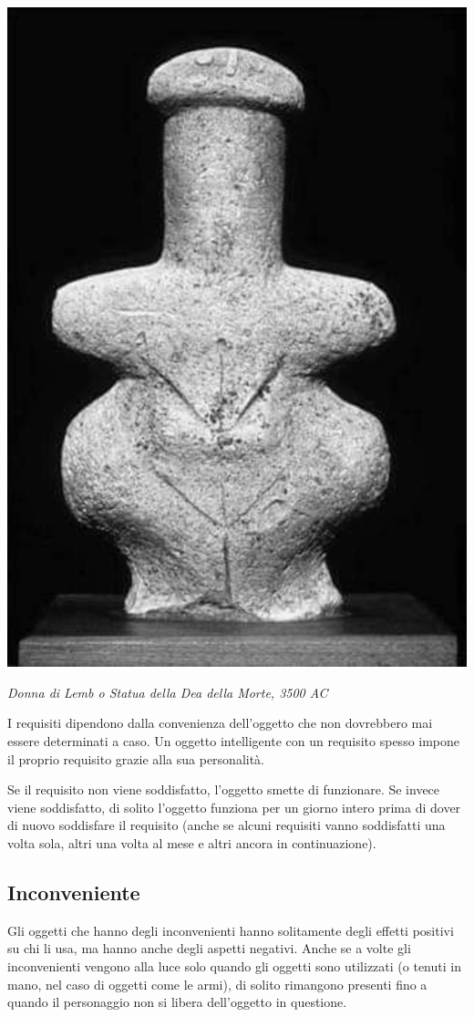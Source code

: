 \begin{multicols}{2}
	\begin{center}
		\includegraphics[width=0.8\linewidth]{immagini/donnalemb.png}

		\textit{Donna di Lemb o Statua della Dea della Morte, 3500 AC}
	\end{center}

	\medskip

	I requisiti dipendono dalla convenienza dell'oggetto che non dovrebbero mai essere determinati a caso. Un oggetto intelligente con un requisito spesso impone il proprio requisito grazie alla sua personalità.

	Se il requisito non viene soddisfatto, l'oggetto smette di funzionare. Se invece viene soddisfatto, di solito l'oggetto funziona per un giorno intero prima di dover di nuovo soddisfare il requisito (anche se alcuni requisiti vanno soddisfatti una volta sola, altri una volta al mese e altri ancora in continuazione).

	\subsection{Inconveniente}

	Gli oggetti che hanno degli inconvenienti hanno solitamente degli effetti positivi su chi li usa, ma hanno anche degli aspetti negativi. Anche se a volte gli inconvenienti vengono alla luce solo quando gli oggetti sono utilizzati (o tenuti in mano, nel caso di oggetti come le armi), di solito rimangono presenti fino a quando il personaggio non si libera dell'oggetto in questione.


\end{multicols}
